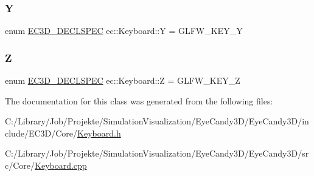 \mbox{\label{classec_1_1_keyboard_a3e6065997f9693286591e1300769e13a}} 
\subsubsection{\texorpdfstring{Y}{Y}}
{\footnotesize\ttfamily enum \mbox{\hyperlink{_common_8h_aac42573e202ca3dd4d259c81691e2369}{E\+C3\+D\+\_\+\+D\+E\+C\+L\+S\+P\+EC}} ec\+::\+Keyboard\+::Y = G\+L\+F\+W\+\_\+\+K\+E\+Y\+\_\+Y}

\mbox{\label{classec_1_1_keyboard_a342c1ef739e9fd209135017e48f25c58}} 
\subsubsection{\texorpdfstring{Z}{Z}}
{\footnotesize\ttfamily enum \mbox{\hyperlink{_common_8h_aac42573e202ca3dd4d259c81691e2369}{E\+C3\+D\+\_\+\+D\+E\+C\+L\+S\+P\+EC}} ec\+::\+Keyboard\+::Z = G\+L\+F\+W\+\_\+\+K\+E\+Y\+\_\+Z}



The documentation for this class was generated from the following files\+:\begin{DoxyCompactItemize}
\item 
C\+:/\+Library/\+Job/\+Projekte/\+Simulation\+Visualization/\+Eye\+Candy3\+D/\+Eye\+Candy3\+D/include/\+E\+C3\+D/\+Core/\mbox{\hyperlink{_keyboard_8h}{Keyboard.\+h}}\item 
C\+:/\+Library/\+Job/\+Projekte/\+Simulation\+Visualization/\+Eye\+Candy3\+D/\+Eye\+Candy3\+D/src/\+Core/\mbox{\hyperlink{_keyboard_8cpp}{Keyboard.\+cpp}}\end{DoxyCompactItemize}
